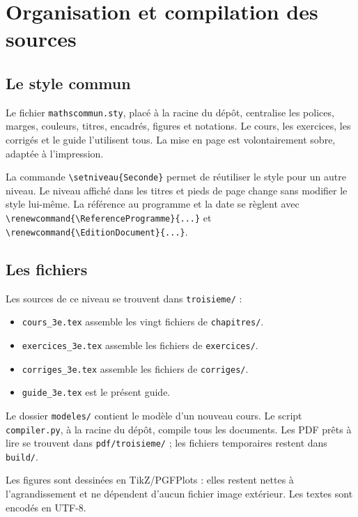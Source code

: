 \documentclass[11pt,a4paper,oneside]{book}
\begin{document}
\chapter{Organisation et compilation des sources}
\section{Le style commun}
Le fichier \texttt{mathscommun.sty}, placé à la racine du dépôt, centralise les polices, marges, couleurs, titres, encadrés, figures et notations. Le cours, les exercices, les corrigés et le guide l'utilisent tous. La mise en page est volontairement sobre, adaptée à l'impression.

La commande \verb|\setniveau{Seconde}| permet de réutiliser le style pour un autre niveau. Le niveau affiché dans les titres et pieds de page change sans modifier le style lui-même. La référence au programme et la date se règlent avec \verb|\renewcommand{\ReferenceProgramme}{...}| et \verb|\renewcommand{\EditionDocument}{...}|.
\section{Les fichiers}
Les sources de ce niveau se trouvent dans \texttt{troisieme/} :
\begin{itemize}
\item \texttt{cours\_3e.tex} assemble les vingt fichiers de \texttt{chapitres/}.
\item \texttt{exercices\_3e.tex} assemble les fichiers de \texttt{exercices/}.
\item \texttt{corriges\_3e.tex} assemble les fichiers de \texttt{corriges/}.
\item \texttt{guide\_3e.tex} est le présent guide.
\end{itemize}
Le dossier \texttt{modeles/} contient le modèle d'un nouveau cours. Le script \texttt{compiler.py}, à la racine du dépôt, compile tous les documents. Les PDF prêts à lire se trouvent dans \texttt{pdf/troisieme/} ; les fichiers temporaires restent dans \texttt{build/}.

Les figures sont dessinées en TikZ/PGFPlots : elles restent nettes à l'agrandissement et ne dépendent d'aucun fichier image extérieur. Les textes sont encodés en UTF-8.
\clearpage
\end{document}

